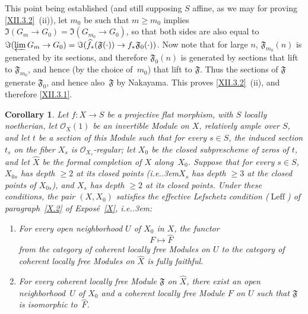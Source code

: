\documentclass[11pt,a4paper,oneside]{book}
\providecommand{\sisi}[2]{#2}
\providecommand{\pageoriginale}{%
  \refstepcounter{pageoriginal}%
  \marginpar{\raggedright\footnotesize\bfseries\thepageoriginal}%
  \xspace}
\providecommand{\ie}{i.e.\kern.3em}
\providecommand{\Oo}{\mathcal O}
\providecommand{\formelF}{\mathfrak F}
\providecommand{\OX}{\mathcal O_X}
\providecommand{\Leff}{\operatorname{Leff}}
\providecommand{\mto}{\longmapsto}
\newenvironment{enumeratea}
  {\begin{enumerate}[label=\alph*)]}
  {\end{enumerate}}
\theoremstyle{plain}
\newtheorem{corollaire}[subsection]{Corollary}
\theoremstyle{definition}
\theoremstyle{remark}
\renewcommand{\Ref}[1]{\textup{\ref{#1}}}
\begin{document}
This point being established (and still supposing $S$ affine, as we may for proving \Ref{XII.3.2}~(ii)), let $m_0$ be such that $m\geq m_0$ implies $\Im(G_m\to G_0)= \Im(G_{m_0}\to G_0)$, so that both sides are also equal to $\Im(\varprojlim G_m\to G_0) = \Im(\widehat{f}_\ast(\formelF(\cdot))\to f_\ast\formelF_0(\cdot))$. Now note that for large $n$, $\formelF_{m_0}(n)$ is generated by its sections, and therefore $\formelF_0(n)$ is generated by sections that lift to $\formelF_{m_0}$, and hence (by the choice of~$m_0$) that lift to $\formelF$. Thus the sections of $\formelF$ generate $\formelF_0$, and hence also~$\formelF$ by Nakayama. This proves \Ref{XII.3.2}~(ii), and therefore \Ref{XII.3.1}.

\begin{corollaire} \label{XII.3.4}
Let $f:X\to S$ be a projective flat morphism, with $S$ locally noetherian, let $\OX(1)$ be an invertible Module on $X$, relatively ample over $S$, and let $t$ be a section of this Module such that for every $s\in S$, the induced section $t_s$ on\pageoriginale the fiber $X_s$ is $\Oo_{X_s}$-regular; let $X_0$ be the closed subprescheme of zeros of $t$, and let $\widehat{X}$ be the formal completion of $X$ along~$X_0$. Suppose that for every $s\in S$, $X_{0s}$ has depth $\geq 2$ at its closed points (\ie $X_s$ has depth $\geq 3$ at the closed points of $X_{0s}$), and $X_s$ has depth $\geq 2$ at its closed points. Under these conditions, the pair $(X, X_0)$ satisfies the effective Lefschetz condition ($\Leff$) \sisi{of \Ref{X}~\Ref{X.2}}{of paragraph~\Ref{X.2} of Expos\'e~\emph{\Ref{X}}}, \ie:
\begin{enumeratea}
\item
For every open neighborhood $U$ of $X_0$ in $X$, the functor
\[
F \sisi{\rightsquigarrow}{\mto} \widehat{F}
\]
from the category of coherent locally free Modules on $U$ to the category of coherent locally free Modules on $\widehat{X}$ is fully faithful.
\item
For every coherent locally free Module $\formelF$ on $\widehat{X}$, there exist an open neighborhood~$U$ of $X_0$ and a coherent locally free Module $F$ on $U$ such that $\formelF$ is isomorphic to~$\widehat{F}$.
\end{enumeratea}
\end{corollaire}
\end{document}
